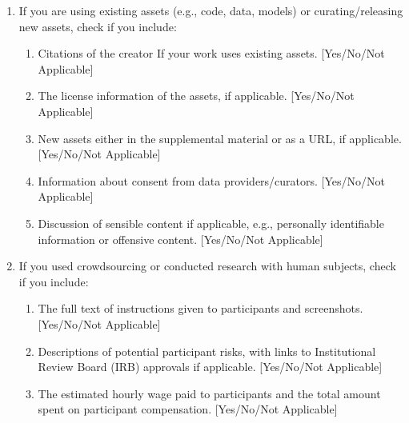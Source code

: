 \documentclass[twoside]{article}
\begin{document}
\begin{enumerate}
  \item If you are using existing assets (e.g., code, data, models) or curating/releasing new assets, check if you include:
  \begin{enumerate}
    \item Citations of the creator If your work uses existing assets. [Yes/No/Not Applicable]
    \item The license information of the assets, if applicable. [Yes/No/Not Applicable]
    \item New assets either in the supplemental material or as a URL, if applicable. [Yes/No/Not Applicable]
    \item Information about consent from data providers/curators. [Yes/No/Not Applicable]
    \item Discussion of sensible content if applicable, e.g., personally identifiable information or offensive content. [Yes/No/Not Applicable]
  \end{enumerate}

  \item If you used crowdsourcing or conducted research with human subjects, check if you include:
  \begin{enumerate}
    \item The full text of instructions given to participants and screenshots. [Yes/No/Not Applicable]
    \item Descriptions of potential participant risks, with links to Institutional Review Board (IRB) approvals if applicable. [Yes/No/Not Applicable]
    \item The estimated hourly wage paid to participants and the total amount spent on participant compensation. [Yes/No/Not Applicable]
  \end{enumerate}

\end{enumerate}
\end{document}
